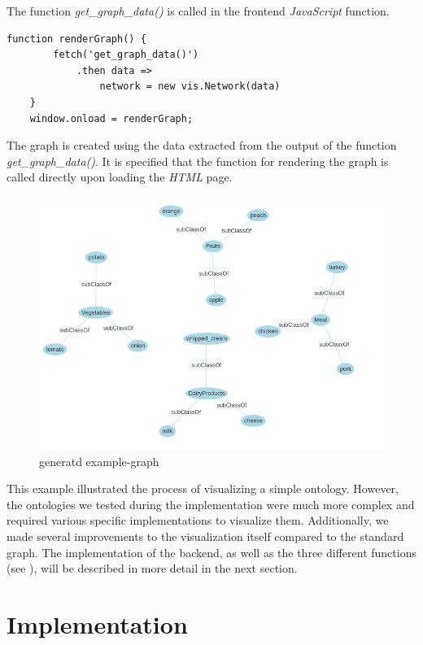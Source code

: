 The function \textit{get\_graph\_data()} is called in the frontend \textit{JavaScript} function.

\begin{lstlisting}[caption={Frontend visualization function},captionpos=b]
    function renderGraph() {
        fetch('get_graph_data()')
            .then data =>
                network = new vis.Network(data)
    }
    window.onload = renderGraph;

\end{lstlisting}

The graph is created using the data extracted from the output of the function 
\textit{get\_graph\_data()}. It is specified that the function for rendering the graph is called directly upon loading the \textit{HTML} page.

\begin{figure}[H]
    \includegraphics[scale=0.45]{Graphics/simple_ontology_example.png}
    \caption{generatd example-graph}
\end{figure}


This example illustrated the process of visualizing a simple ontology. However, the ontologies we tested during the implementation were much more complex and required various specific implementations to visualize them. Additionally, we made several improvements to the visualization itself compared to the standard graph. The implementation of the backend, as well as the three different functions (see ), will be described in more detail in the next section.
\section{Implementation}
\label{sec:Implementation}

